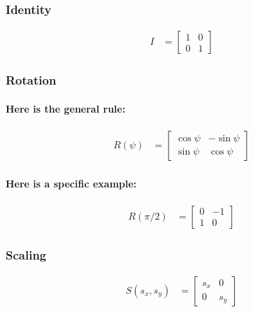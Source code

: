 \documentclass[twoside]{article}
\begin{document}
\subsubsection{Identity}

\begin{align*}
  I & = \left[ \begin{array}{rr}
    1 & 0 \\
    0 & 1
    \end{array} \right]
  \end{align*}

\subsubsection{Rotation}

\paragraph{Here is the general rule:}

\begin{align*}
  R( \psi ) & = \left[ \begin{array}{rr}
    \cos \psi & -\sin \psi \\
    \sin \psi & \cos \psi
    \end{array} \right]
  \end{align*}

\paragraph{Here is a specific example:}

\begin{align*}
  R( \pi/2 ) & = \left[ \begin{array}{rr}
    0 & -1 \\
    1 & 0
    \end{array} \right]
  \end{align*}

\subsubsection{Scaling}

\begin{align*}
  S( s_x, s_y ) & = \left[ \begin{array}{rr}
    s_x & 0 \\
    0 & s_y
    \end{array} \right]
  \end{align*}
\end{document}
